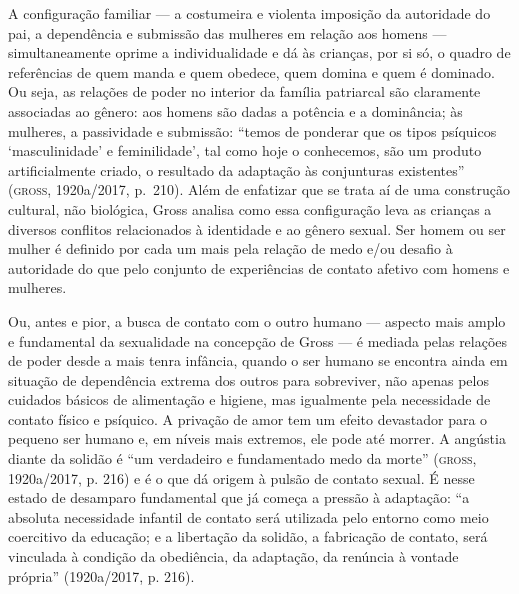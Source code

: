 A configuração familiar --- a costumeira e violenta imposição da
autoridade do pai, a dependência e submissão das mulheres em relação aos
homens --- simultaneamente oprime a individualidade e dá às crianças, por
si só, o quadro de referências de quem manda e quem obedece, quem domina
e quem é dominado. Ou seja, as relações de poder no interior da família
patriarcal são claramente associadas ao gênero: aos homens são dadas a
potência e a dominância; às mulheres, a passividade e submissão: ``temos
de ponderar que os tipos psíquicos `masculinidade' e feminilidade', tal
como hoje o conhecemos, são um produto artificialmente criado, o
resultado da adaptação às conjunturas existentes'' (\textsc{gross}, 1920a/2017, p.~210). Além de enfatizar que se trata aí de uma construção cultural, não biológica, Gross analisa
como essa configuração leva as crianças a diversos conflitos
relacionados à identidade e ao gênero sexual. Ser homem ou ser mulher é
definido por cada um mais pela relação de medo e/ou desafio à autoridade
do que pelo conjunto de experiências de contato afetivo com homens e
mulheres.

Ou, antes e pior, a busca de contato com o outro humano --- aspecto mais
amplo e fundamental da sexualidade na concepção de Gross --- é mediada
pelas relações de poder desde a mais tenra infância, quando o ser humano
se encontra ainda em situação de dependência extrema dos outros para
sobreviver, não apenas pelos cuidados básicos de alimentação e higiene,
mas igualmente pela necessidade de contato físico e psíquico. A privação
de amor tem um efeito devastador para o pequeno ser humano e, em níveis
mais extremos, ele pode até morrer. A angústia diante da solidão é ``um
verdadeiro e fundamentado medo da morte'' (\textsc{gross}, 1920a/2017, p. 216) e é o que dá origem à pulsão
de contato sexual. É nesse estado de desamparo fundamental que já começa
a pressão à adaptação: ``a absoluta necessidade infantil de contato será
utilizada pelo entorno como meio coercitivo da educação; e a libertação
da solidão, a fabricação de contato, será vinculada à condição da
obediência, da adaptação, da renúncia à vontade própria'' (1920a/2017, p. 216).

